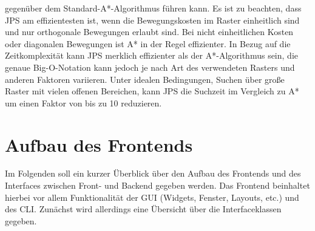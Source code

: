 \begin{itemize}
    gegenüber dem Standard-A*-Algorithmus führen kann.
    Es ist zu beachten, dass JPS am effizientesten ist, wenn die Bewegungskosten im Raster einheitlich sind und nur
    orthogonale Bewegungen erlaubt sind.
    Bei nicht einheitlichen Kosten oder diagonalen Bewegungen ist A* in der Regel effizienter.
    In Bezug auf die Zeitkomplexität kann JPS merklich effizienter als der A*-Algorithmus sein, die genaue Big-O-Notation
    kann jedoch je nach Art des verwendeten Rasters und anderen Faktoren variieren.
    Unter idealen Bedingungen, Suchen über große Raster mit vielen offenen Bereichen, kann JPS die Suchzeit im Vergleich
    zu A* um einen Faktor von bis zu 10 reduzieren. \cite{harabor2014}
\end{itemize}
\section{Aufbau des Frontends}
\label{sec:aufbau_frontend}
Im Folgenden soll ein kurzer Überblick über den Aufbau des Frontends und des Interfaces zwischen Front- und Backend gegeben werden.
Das Frontend beinhaltet hierbei vor allem Funktionalität der \ac{GUI} (Widgets, Fenster, Layouts, etc.) und des \ac{CLI}.
Zunächst wird allerdings eine Übersicht über die Interfaceklassen gegeben.

